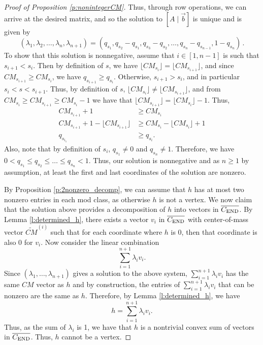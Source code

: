 \documentclass[12pt]{amsart}
\theoremstyle{definition}
\numberwithin{equation}{section}
\renewcommand\>{\rangle}
\newcommand\<{\langle}
\newcommand\0{\mathbf{0}}
\def\wt#1{{\widetilde {#1}}}
\newcommand{\CEND}{C_\textnormal{END}}
\begin{document}
\begin{proof}[Proof of Proposition \ref{p:nonintegerCM}]
	Thus, through row operations, we can arrive at the desired matrix, and so the solution to $[A \mid \vec{b}]$ is unique and is given by 
	\[
	(\lambda_1 ,\lambda_2, \dots, \lambda_n, \lambda_{n+1}) = (q_{s_1} ,q_{s_2} - q_{s_1} , q_{s_3} - q_{s_2}, \dots, q_{s_n} - q_{s_{n-1}}, 1 - q_{s_n} ) \, .
	\]
	To show that this solution is nonnegative, assume that $i \in [1,n-1]$ is such that $s_{i+1} < s_i$. 
	Then by definition of $s$, we have $\lfloor CM_{s_i} \rfloor = \lfloor CM_{s_{i+1}} \rfloor$, and since $CM_{s_{i+1}} \geq CM_{s_i}$, we have $q_{s_{i+1}} \geq q_{s_i}$. Otherwise, $s_{i+1} > s_i$, and in particular $s_i < s < s_{i+1}$. 
	Thus, by definition of $s$, $\lfloor CM_{s_i} \rfloor \neq \lfloor CM_{s_{i+1}} \rfloor$, and from $CM_{s_i} \geq CM_{s_{i+1}} \geq CM_{s_i} - 1$ we have that $\lfloor CM_{s_{i+1}} \rfloor = \lfloor CM_{s_{i}} \rfloor - 1$. Thus,
	\begin{align*}
		CM_{s_{i+1}} +1 &\geq CM_{s_i}\\
		CM_{s_{i+1}} + 1 - \lfloor CM_{s_{i+1}} \rfloor &\geq CM_{s_i} - \lfloor CM_{s_{i}} \rfloor + 1\\
		q_{s_{i_1}} & \geq q_{s_i}.
	\end{align*} 
	Also, note that by definition of $s_i$, $q_{s_1} \neq 0$ and $q_{s_n} \neq 1$. Therefore, we have $0 < q_{s_1} \leq q_{s_2} \leq \dots \leq q_{s_n} < 1$. Thus, our solution is nonnegative and as $n \geq 1$ by assumption, at least the first and last coordinates of the solution are nonzero.
	
	By Proposition \ref{p:2nonzero_decomp}, we can assume that $h$ has at most two nonzero entries in each mod class, as otherwise $h$ is not a vertex. 
	We now claim that the solution above provides a decomposition of $h$ into vectors in $\overline{\CEND}$. By Lemma \ref{l:determined_h}, there exists a vector $v_i$ in $\overline{\CEND}$ with center-of-mass vector $\wt{CM}^{(i)}$ such that for each coordinate where $h$ is 0, then that coordinate is also 0 for $v_i$. 
	Now consider the linear combination
	\[\sum_{i = 1}^{n+1} \lambda_i v_i.\]
	Since $(\lambda_1, \dots, \lambda_{n+1})$ gives a solution to the above system, $\sum_{i = 1}^{n+1} \lambda_i v_i$ has the same $CM$ vector as $h$ and by construction, the entries of $\sum_{i = 1}^{n+1} \lambda_i v_i$ that can be nonzero are the same as $h$. Therefore, by Lemma \ref{l:determined_h}, we have 
	\[h = \sum_{i = 1}^{n+1} \lambda_i v_i.\]
	Thus, as the sum of $\lambda_i$ is 1, we have that $h$ is a nontrivial convex sum of vectors in $\overline{\CEND}$. Thus, $h$ cannot be a vertex.
\end{proof}
\end{document}
